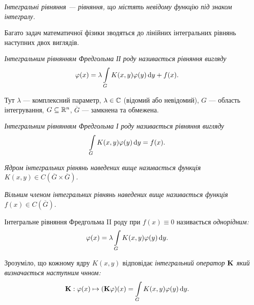 \begin{definition}
	\it{Інтегральні рівняння} --- рівняння, що містять невідому функцію під знаком інтегралу.
\end{definition}

Багато задач математичної фізики зводяться до лінійних інтегральних рівнянь наступних двох виглядів.

\begin{definition}
	\it{Інтегральним рівнянням Фредгольма ІІ роду} називається рівняння вигляду
	\begin{equation}
		\phi(x) = \lambda \Int_G K(x, y) \phi(y) \diff y + f(x).
	\end{equation}
\end{definition}

Тут $\lambda$ --- комплексний параметр, $\lambda \in \CC$ (відомий або невідомий), $G$ --- область інтегрування, $G \subseteq \RR^n$, $\overline G$ --- замкнена та обмежена.

\begin{definition}
	\it{Інтегральним рівнянням Фредгольма І роду} називається рівняння вигляду
	\begin{equation}
		\Int_G K(x, y) \phi(y) \diff y = f(x).
	\end{equation}
\end{definition}

\begin{definition}
	\it{Ядром} інтегральних рівнянь наведених вище називається функція $K(x, y) \in C\left(\overline G\times\overline G\right)$.
\end{definition}

\begin{definition}
	\it{Вільним членом} інтегральних рівнянь наведених вище називається функція $f(x) \in C\left(\overline G\right)$.
\end{definition}

\begin{definition}
	Інтегральне рівняння Фредгольма II роду при $f(x) \equiv 0$ називається \it{однорідним}:
	\begin{equation}
		\phi(x) = \lambda \Int_G K(x, y) \phi(y) \diff y.
	\end{equation}
\end{definition}

\begin{definition}
	Зрозуміло, що кожному ядру $K(x, y)$ відповідає \it{інтегральний оператор} $\bf{K}$ який визначається наступним чнном:
	\begin{equation}
		\bf{K}: \phi(x) \mapsto (\bf{K} \phi)(x) = \Int_G K(x, y) \phi(y) \diff y.
	\end{equation}
\end{definition}

